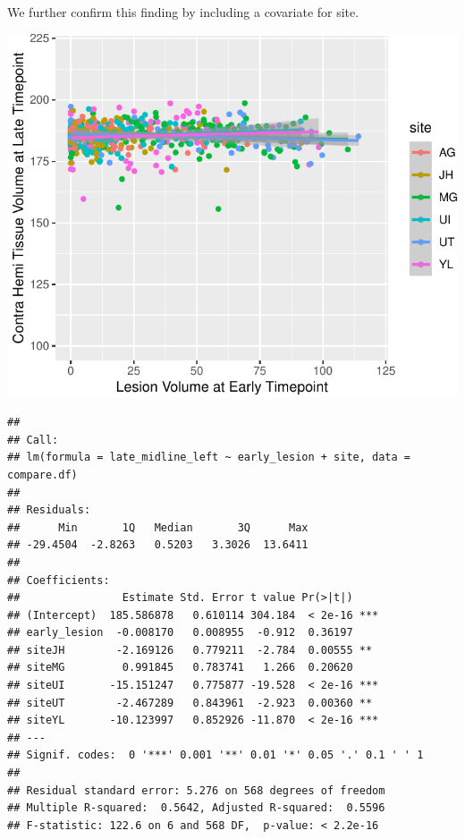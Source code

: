 \documentclass[
]{article}
\begin{document}
We further confirm this finding by including a covariate for site.

\begin{center}\includegraphics{paper_files/figure-latex/plot_harm_contra-1} \end{center}

\begin{verbatim}
## 
## Call:
## lm(formula = late_midline_left ~ early_lesion + site, data = compare.df)
## 
## Residuals:
##      Min       1Q   Median       3Q      Max 
## -29.4504  -2.8263   0.5203   3.3026  13.6411 
## 
## Coefficients:
##                Estimate Std. Error t value Pr(>|t|)    
## (Intercept)  185.586878   0.610114 304.184  < 2e-16 ***
## early_lesion  -0.008170   0.008955  -0.912  0.36197    
## siteJH        -2.169126   0.779211  -2.784  0.00555 ** 
## siteMG         0.991845   0.783741   1.266  0.20620    
## siteUI       -15.151247   0.775877 -19.528  < 2e-16 ***
## siteUT        -2.467289   0.843961  -2.923  0.00360 ** 
## siteYL       -10.123997   0.852926 -11.870  < 2e-16 ***
## ---
## Signif. codes:  0 '***' 0.001 '**' 0.01 '*' 0.05 '.' 0.1 ' ' 1
## 
## Residual standard error: 5.276 on 568 degrees of freedom
## Multiple R-squared:  0.5642, Adjusted R-squared:  0.5596 
## F-statistic: 122.6 on 6 and 568 DF,  p-value: < 2.2e-16
\end{verbatim}
\end{document}
